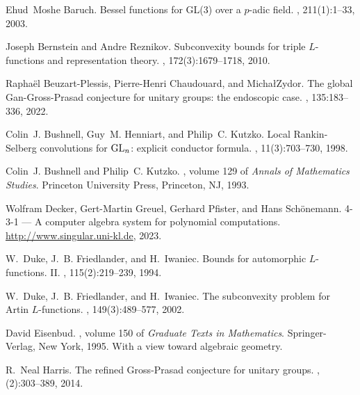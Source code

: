 \documentclass[reqno]{amsart}
\theoremstyle{plain} \newtheorem{theorem} {Theorem} \newtheorem{conjecture} {Conjecture} \newtheorem{corollary} [theorem] {Corollary} \newtheorem{proposition} [theorem] {Proposition} \newtheorem{fact} [theorem] {Fact}
\theoremstyle{definition} \newtheorem{definition} [theorem] {Definition}
\theoremstyle{itplain} %
\begin{document}
\def\cprime{$'$} \def\cprime{$'$} \def\cprime{$'$} \def\cprime{$'$}
\begin{thebibliography}{10}

Ehud~Moshe Baruch.
\newblock Bessel functions for {GL}(3) over a {$p$}-adic field.
, 211(1):1--33, 2003.

Joseph Bernstein and Andre Reznikov.
\newblock Subconvexity bounds for triple {$L$}-functions and representation
  theory.
, 172(3):1679--1718, 2010.

Rapha\"{e}l Beuzart-Plessis, Pierre-Henri Chaudouard, and Micha\l Zydor.
\newblock The global {G}an-{G}ross-{P}rasad conjecture for unitary groups: the
  endoscopic case.
, 135:183--336, 2022.

Colin~J. Bushnell, Guy~M. Henniart, and Philip~C. Kutzko.
\newblock Local {R}ankin-{S}elberg convolutions for {${\rm GL}_n$}: explicit
  conductor formula.
, 11(3):703--730, 1998.

Colin~J. Bushnell and Philip~C. Kutzko.
, volume 129 of {\em Annals of Mathematics Studies}.
\newblock Princeton University Press, Princeton, NJ, 1993.

Wolfram Decker, Gert-Martin Greuel, Gerhard Pfister, and Hans Sch\"onemann.
 {4-3-1} --- {A} computer algebra system for polynomial
  computations.
\newblock \url{http://www.singular.uni-kl.de}, 2023.

W.~Duke, J.~B. Friedlander, and H.~Iwaniec.
\newblock Bounds for automorphic {$L$}-functions. {II}.
, 115(2):219--239, 1994.

W.~Duke, J.~B. Friedlander, and H.~Iwaniec.
\newblock The subconvexity problem for {A}rtin {$L$}-functions.
, 149(3):489--577, 2002.

David Eisenbud.
, volume 150 of {\em Graduate Texts in
  Mathematics}.
\newblock Springer-Verlag, New York, 1995.
\newblock With a view toward algebraic geometry.

R.~Neal Harris.
\newblock The refined {G}ross-{P}rasad conjecture for unitary groups.
, (2):303--389, 2014.


\end{thebibliography}
\end{document}
